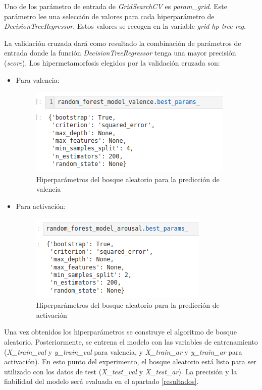 \documentclass[12pt,a4paper,Spanish]{article}
\begin{document}
Uno de los parámetro de entrada de \textit{GridSearchCV} es \textit{param\_grid}. Este parámetro lee una selección de valores para cada hiperparámetro de \textit{DecisionTreeRegressor}. Estos valores se recogen en la variable \textit{grid-hp-tree-reg}.

La validación cruzada dará como resultado la combinación de parámetros de entrada donde la función \textit{DecisionTreeRegressor} tenga una mayor precisión (\textit{score}). Los hipermetamorfosis elegidos por la validación cruzada son:
\begin{itemize}
	\item Para valencia:
	\begin{figure}[H]
		\centering
		\includegraphics[width=0.7\linewidth]{figs/final_params_random_forest_valence}
		\caption{Hiperparámetros del bosque aleatorio para la predicción de valencia}
		\label{fig:finalparamsrandomforestvalence}
	\end{figure}
	\item Para activación:
	\begin{figure}[H]
		\centering
		\includegraphics[width=0.7\linewidth]{figs/final_params_random_forest_arousal}
		\caption{Hiperparámetros del bosque aleatorio para la predicción de activación}
		\label{fig:finalparamsrandomforestarousal}
	\end{figure}
\end{itemize}
Una vez obtenidos los hiperparámetros se construye el algoritmo de bosque aleatorio. Posteriormente, se entrena el modelo con las variables de entrenamiento (\textit{X\_train\_val} y \textit{y\_train\_val} para valencia, y \textit{X\_train\_ar} y \textit{y\_train\_ar} para activación).
\newline
En esto punto del experimento, el bosque aleatorio está listo para ser utilizado con los datos de test (\textit{X\_test\_val} y \textit{X\_test\_ar}). La precisión y la fiabilidad del modelo será evaluada en el apartado \ref{resultados}.
\end{document}
